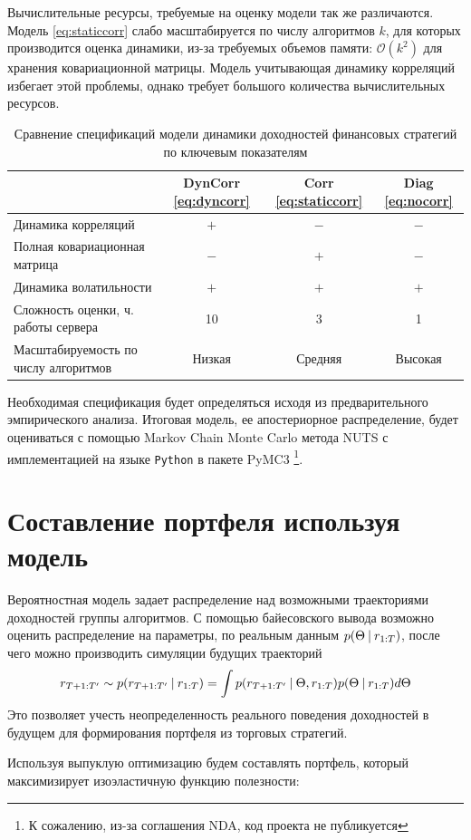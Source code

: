 Вычислительные ресурсы, требуемые на оценку модели так же различаются. Модель \eqref{eq:staticcorr} слабо масштабируется по числу алгоритмов $k$, для которых производится оценка динамики, из-за требуемых объемов памяти: $\mathcal{O}(k^2)$ для хранения ковариационной матрицы. Модель учитывающая динамику корреляций избегает этой проблемы, однако требует большого количества вычислительных ресурсов.
\begin{table}[h]
	\caption{Сравнение спецификаций модели динамики доходностей финансовых стратегий по ключевым показателям}
	\begin{tabular}{l|c|c|c}
		& DynCorr \eqref{eq:dyncorr} & Corr \eqref{eq:staticcorr}& Diag \eqref{eq:nocorr} \\ \hline
		Динамика корреляций & $+$ & $-$ & $-$ \\ \hline
		Полная ковариационная матрица &$-$ & $+$ & $-$ \\ \hline
		Динамика волатильности  &$+$ & $+$ & $+$ \\ \hline
		Сложность оценки, ч. работы сервера &10 & 3 & 1 \\ \hline
		Масштабируемость по числу алгоритмов & Низкая & Средняя & Высокая
	\end{tabular}
\end{table}

Необходимая спецификация будет определяться исходя из предварительного эмпирического анализа. Итоговая модель, ее апостериорное распределение, будет оцениваться с помощью Markov Chain Monte Carlo метода NUTS \citep{hoffman2011nuts} с имплементацией на языке \texttt{Python} в пакете PyMC3 \citep{salvatier2016pymc3}\footnote{К сожалению, из-за соглашения NDA, код проекта не публикуется}.

\section{Составление портфеля используя модель}
Вероятностная модель задает распределение над возможными траекториями доходностей группы алгоритмов. С помощью байесовского вывода возможно оценить распределение на параметры, по реальным данным $p(\Theta\:|\: r_{1:T})$, после чего можно производить симуляции будущих траекторий 
\[r_{T+1:T'} \sim p(r_{T+1:T'}\:|\: r_{1:T}) = \int p(r_{T+1:T'}\:|\:\Theta, r_{1:T})p(\Theta\:|\: r_{1:T}) d\Theta\] 
Это позволяет учесть неопределенность реального поведения доходностей в будущем для формирования портфеля из торговых стратегий.

Используя выпуклую оптимизацию будем составлять портфель, который максимизирует изоэластичную функцию полезности:

